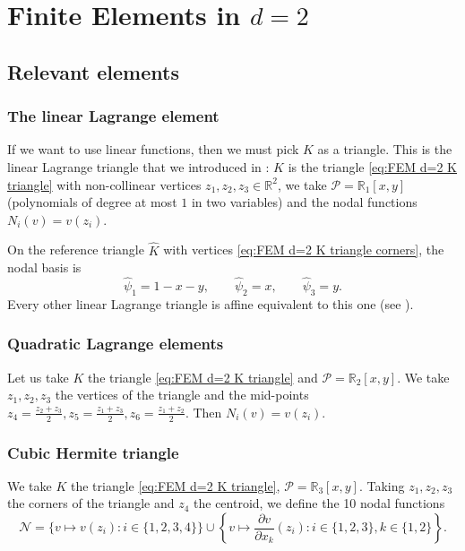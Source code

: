\chapter{Finite Elements in \texorpdfstring{$d=2$}{d=2}}

\section{Relevant elements}
\subsection{The linear Lagrange element}

If we want to use linear functions, then we must pick $K$ as a triangle.
This is the linear Lagrange triangle that we introduced in : $K$ is the triangle \eqref{eq:FEM d=2 K triangle} with non-collinear vertices $z_1, z_2, z_3 \in \mathbb R^2$,
we take $\mathcal P = \mathbb R_1[x,y]$ (polynomials of degree at most $1$ in two variables) and the nodal functions  $N_i (v) = v(z_i)$.

\begin{example}
    On the reference triangle $\widehat K$ with vertices \eqref{eq:FEM d=2 K triangle corners}, the nodal basis is
    \begin{equation*}
        \widehat\psi_1 = 1-x-y, \qquad \widehat\psi_2 = x, \qquad \widehat\psi_3 = y.
    \end{equation*}
    Every other linear Lagrange triangle is affine equivalent to this one (see ).
\end{example}

\subsection{Quadratic Lagrange elements}

Let us take $K$ the triangle \eqref{eq:FEM d=2 K triangle} and $\mathcal P = \mathbb R_2[x,y]$.
We take $z_1, z_2, z_3$ the vertices of the triangle and the mid-points $z_4 = \frac{z_2 + z_3}{2}, z_5 = \frac{z_1 + z_3}{2}, z_6 = \frac{z_1+z_2}{2}$. Then $N_i (v) = v(z_i)$.

\subsection{Cubic Hermite triangle}

We take $K$ the triangle \eqref{eq:FEM d=2 K triangle}, $\mathcal P = \mathbb R_3[x,y]$.
Taking $z_1, z_2,z_3$ the corners of the triangle and $z_4$ the centroid, we define the 10 nodal functions
\begin{equation*}
    \mathcal N = \{ v \mapsto v(z_i): i \in \{1,2,3,4\} \} \cup \left\{v \mapsto \frac{\partial v}{\partial x_k} (z_{i}) : i \in \{1,2,3\} , k \in \{1,2\}\right\}.
\end{equation*}



